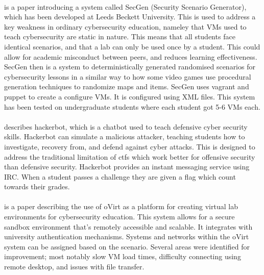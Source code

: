 \paragraph{}\cite{schreuders_generating_2015} is a paper introducing a system called SecGen (Security Scenario Generator), which has been developed at Leeds Beckett University. This is used to address a key weakness in ordinary cybersecurity education, nameley that VMs used to teach cybersecurity are static in nature. This means that all students face identical scenarios, and that a lab can only be used once by a student. This could allow for academic misconduct between peers, and reduces learning effectiveness. SecGen then is a system to deterministically generated randomised scenarios for cybersecurity lessons in a similar way to how some video games use procedural generation techniques to randomize maps and items. SecGen uses vagrant and puppet to create a configure VMs. It is configured using XML files. This system has been tested on undergraduate students where each student got 5-6 VMs each.

\paragraph{}\cite{schreuders_hackerbot_2018} describes hackerbot, which is a chatbot used to teach defensive cyber security skills. Hackerbot can simulate a malicious attacker, teaching students how to investigate, recovery from, and defend against cyber attacks. This is designed to address the traditional limitation of \acrshort{ctf}s which work better for offensive security than defensive security. Hackerbot provides an instant messaging service using IRC. When a student passes a challenge they are given a flag which count towards their grades.

\paragraph{}\cite{schreuders_open_nodate} is a paper describing the use of oVirt as a platform for creating virtual lab environments for cybersecurity education. This system allows for a secure sandbox environment that's remotely accessible and scalable. It integrates with university authentication mechanisms. Systems and networks within the oVirt system can be assigned based on the scenario. Several areas were identified for improvement; most notably slow VM load times, difficulty connecting using remote desktop, and issues with file transfer.

